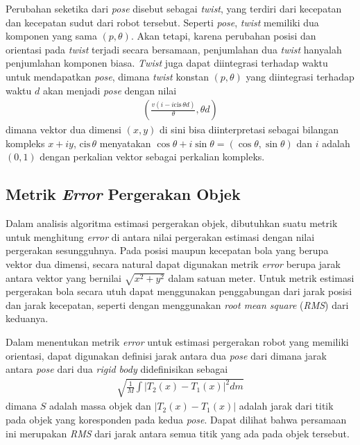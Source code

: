 Perubahan seketika dari \textit{pose} disebut sebagai \textit{twist}, yang terdiri dari kecepatan dan kecepatan sudut dari robot tersebut. Seperti \textit{pose}, \textit{twist} memiliki dua komponen yang sama $(p, \theta)$. Akan tetapi, karena perubahan posisi dan orientasi pada \textit{twist} terjadi secara bersamaan, penjumlahan dua \textit{twist} hanyalah penjumlahan komponen biasa. \textit{Twist} juga dapat diintegrasi terhadap waktu untuk mendapatkan \textit{pose}, dimana \textit{twist} konstan $(p, \theta)$ yang diintegrasi terhadap waktu $d$ akan menjadi \textit{pose} dengan nilai
\begin{align}
    \left(\frac{v(i - i \text{cis}\, \theta d)}{\theta}, \theta d\right)
\end{align}
dimana vektor dua dimensi $(x, y)$ di sini bisa diinterpretasi sebagai bilangan kompleks $x + iy$, $\text{cis}\, \theta$ menyatakan $\cos \theta + i \sin \theta = (\cos \theta, \sin \theta)$ dan $i$ adalah $(0, 1)$ dengan perkalian vektor sebagai perkalian kompleks.

\subsection{Metrik \textit{Error} Pergerakan Objek}

Dalam analisis algoritma estimasi pergerakan objek, dibutuhkan suatu metrik untuk menghitung \textit{error} di antara nilai pergerakan estimasi dengan nilai pergerakan sesungguhnya. Pada posisi maupun kecepatan bola yang berupa vektor dua dimensi, secara natural dapat digunakan metrik \textit{error} berupa jarak antara vektor yang bernilai $\sqrt{x^2 + y^2}$ dalam satuan meter. Untuk metrik estimasi pergerakan bola secara utuh dapat menggunakan penggabungan dari jarak posisi dan jarak kecepatan, seperti dengan menggunakan \textit{root mean square} (\textit{RMS}) dari keduanya.

Dalam menentukan metrik \textit{error} untuk estimasi pergerakan robot yang memiliki orientasi, dapat digunakan definisi jarak antara dua \textit{pose} dari \citet{bregier2018} dimana jarak antara \textit{pose} dari dua \textit{rigid body} didefinisikan sebagai
\begin{align}
    \sqrt{\frac{1}{M}\int |T_2(x)-T_1(x)|^2 dm}
\end{align}
dimana $S$ adalah massa objek dan $|T_2(x)-T_1(x)|$ adalah jarak dari titik pada objek yang koresponden pada kedua \textit{pose}. Dapat dilihat bahwa persamaan ini merupakan \textit{RMS} dari jarak antara semua titik yang ada pada objek tersebut.

